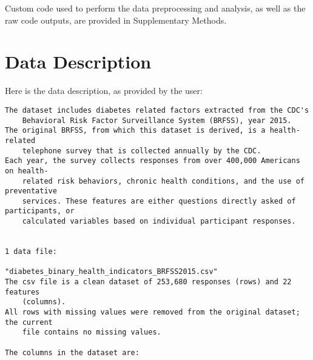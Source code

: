 \documentclass[11pt]{article}
\begin{document}
Custom code used to perform the data preprocessing and analysis, as well as the raw code outputs, are provided in Supplementary Methods.


\clearpage
\appendix

\section{Data Description} \label{sec:data_description} Here is the data description, as provided by the user:

\begin{Verbatim}[tabsize=4]
The dataset includes diabetes related factors extracted from the CDC's
	Behavioral Risk Factor Surveillance System (BRFSS), year 2015.
The original BRFSS, from which this dataset is derived, is a health-related
	telephone survey that is collected annually by the CDC.
Each year, the survey collects responses from over 400,000 Americans on health-
	related risk behaviors, chronic health conditions, and the use of preventative
	services. These features are either questions directly asked of participants, or
	calculated variables based on individual participant responses.


1 data file:

"diabetes_binary_health_indicators_BRFSS2015.csv"
The csv file is a clean dataset of 253,680 responses (rows) and 22 features
	(columns).
All rows with missing values were removed from the original dataset; the current
	file contains no missing values.

The columns in the dataset are:


\end{Verbatim}
\end{document}
